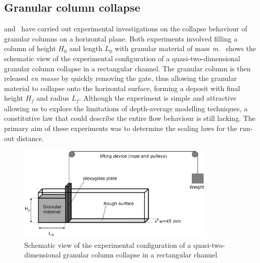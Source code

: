 \subsection{Granular column collapse}

\citet{Lube2005} and~\citet{Lajeunesse2004} have carried out experimental 
investigations on the collapse behaviour of granular columns on a horizontal 
plane. Both experiments involved filling a column of height 
$\textit{H}_{\textit{0}}$ and length $\textit{L}_{\textit{0}}$ with granular 
material of mass \textit{m}.~ shows the schematic view of the 
experimental configuration of a quasi-two-dimensional granular column collapse 
in a rectangular channel. The granular column is then released \textit{en 
masse} by quickly removing the gate, thus allowing the granular material to 
collapse onto the horizontal surface, forming a deposit with final height 
$\textit{H}_{\textit{f}}$ and radius $\textit{L}_{\textit{f}}$. Although the 
experiment is simple and attractive allowing us to explore the limitations of 
depth-average modelling techniques, a constitutive law that could describe the 
entire flow behaviour is still lacking. The primary aim of these experiments 
was to determine the scaling laws for the run-out distance.


\begin{figure}[tbhp]
\centering
\includegraphics[width=0.85\textwidth]{experiment_setup}
\caption{Schematic view of the experimental configuration of a 
quasi-two-dimensional granular column 
collapse in a rectangular channel~\citep{Lajeunesse2004}}
\label{fig:exp}
\end{figure}

